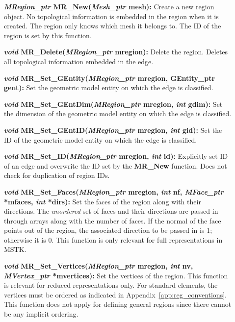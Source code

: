 \documentclass[12pt]{article}
\begin{document}
\begin{description}
\item[]\textbf{\textit{MRegion\_ptr} MR\_New(\textit{Mesh\_ptr} mesh):}
Create a new region object. No topological information is embedded in
the region when it is created. The region only knows which mesh it
belongs to. The ID of the region is set by this function.

\item[]\textbf{\textit{void} MR\_Delete(\textit{MRegion\_ptr} mregion):}
Delete the region. Deletes all topological information embedded in the
edge.

\item[]\textbf{\textit{void} MR\_Set\_GEntity(\textit{MRegion\_ptr} mregion,
GEntity\_ptr gent):} Set the geometric model entity on which the edge
is classified.

\item[]\textbf{\textit{void} MR\_Set\_GEntDim(\textit{MRegion\_ptr} mregion,
\textit{int} gdim):} Set the dimension of the geometric model entity on
which the edge is classified.

\item[]\textbf{\textit{void} MR\_Set\_GEntID(\textit{MRegion\_ptr} mregion,
\textit{int} gid):} Set the ID of the geometric model entity on which
the edge is classified.

\item[]\textbf{\textit{void} MR\_Set\_ID(\textit{MRegion\_ptr} mregion,
\textit{int} id):} Explicitly set ID of an edge and overwrite the ID
set by the \textbf{MR\_New} function. Does not check for duplication
of region IDs.

\item[]\textbf{\textit{void} MR\_Set\_Faces(\textit{MRegion\_ptr} mregion,
\textit{int} nf, \textit{MFace\_ptr} *mfaces, \textit{int} *dirs):} Set
the faces of the region along with their directions. The
\textit{unordered} set of faces and their directions are passed in
through arrays along with the number of faces. If the normal of the
face points out of the region, the associated direction to be passed
in is 1; otherwise it is 0. This function is only relevant for full
representations in MSTK.

\item[]\textbf{\textit{void} MR\_Set\_Vertices(\textit{MRegion\_ptr}
mregion, \textit{int} nv, \textit{MVertex\_ptr} *mvertices):} Set the
vertices of the region. This function is relevant for reduced
representations only. For standard elements, the vertices must be
ordered as indicated in Appendix~\ref{app:reg_conventions}. This
function does not apply for defining general regions since there
cannot be any implicit ordering.


\end{description}
\end{document}
